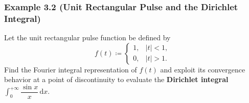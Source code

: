\documentclass[11pt,a4paper]{article}
\theoremstyle{definition}
\theoremstyle{plain}
\begin{document}
\subsubsection*{Example 3.2 (Unit Rectangular Pulse and the Dirichlet Integral)}

Let the unit rectangular pulse function be defined by
\begin{equation}
f(t) \coloneqq
\begin{cases}
1, & |t| < 1, \\
0, & |t| > 1.
\end{cases}
\end{equation}
Find the Fourier integral representation of $f(t)$ and exploit its convergence behavior at a point of discontinuity to evaluate the \textbf{Dirichlet integral} $\int_{0}^{+\infty} \dfrac{\sin x}{x} \, \mathrm{d}x$.
\end{document}
